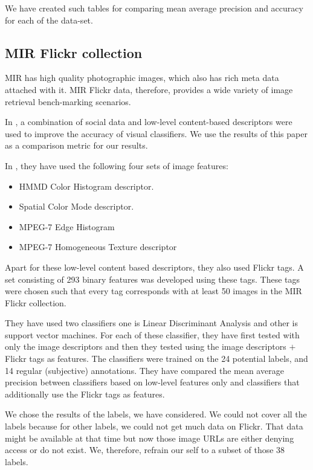 We have created such tables for comparing mean average precision and accuracy for each of the data-set.
\subsection{MIR Flickr collection }
MIR has high quality photographic images, which also has rich meta data attached with it. MIR Flickr data, therefore,  provides a wide variety of image retrieval bench-marking scenarios.

In \citep{MIRresults}, a combination of social data and low-level content-based descriptors were used to improve the accuracy of visual classifiers. We use the results of this paper as a comparison metric for our results.

In \citep{MIRresults}, they have used the following four sets of image features:
\begin{itemize}
\item HMMD Color Histogram descriptor.
\item Spatial Color Mode descriptor.
\item MPEG-7 Edge Histogram
\item MPEG-7 Homogeneous Texture descriptor
\end{itemize}

Apart for these low-level content based descriptors, they also used Flickr tags.  A set consisting of 293 binary features was developed using these tags. These tags were chosen such that every tag corresponds with at least 50 images in the MIR Flickr collection.

They have used two classifiers one is Linear Discriminant Analysis and other is support vector machines. For each of these classifier, they have first tested with only the image descriptors and then they tested using the image descriptors $+$ Flickr tags as features. The classifiers were trained on the 24 potential labels, and 14 regular (subjective) annotations. They have compared the mean average precision between classifiers based on low-level features only and classifiers that additionally use the Flickr tags as features.

We chose the results of the labels, we have considered. We could not cover all the labels because for other labels, we could not get much data on Flickr. That data might be available at that time but now those image URLs are either denying access or do not exist. We, therefore, refrain our self to a subset of those 38 labels.

